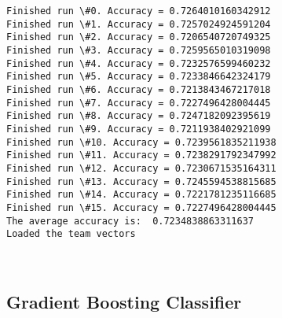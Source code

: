 \documentclass[11pt]{article}
\begin{document}
    \begin{Verbatim}[commandchars=\\\{\}]
Finished run \#0. Accuracy = 0.7264010160342912
Finished run \#1. Accuracy = 0.7257024924591204
Finished run \#2. Accuracy = 0.7206540720749325
Finished run \#3. Accuracy = 0.7259565010319098
Finished run \#4. Accuracy = 0.7232576599460232
Finished run \#5. Accuracy = 0.7233846642324179
Finished run \#6. Accuracy = 0.7213843467217018
Finished run \#7. Accuracy = 0.7227496428004445
Finished run \#8. Accuracy = 0.7247182092395619
Finished run \#9. Accuracy = 0.7211938402921099
Finished run \#10. Accuracy = 0.7239561835211938
Finished run \#11. Accuracy = 0.7238291792347992
Finished run \#12. Accuracy = 0.7230671535164311
Finished run \#13. Accuracy = 0.7245594538815685
Finished run \#14. Accuracy = 0.7221781235116685
Finished run \#15. Accuracy = 0.7227496428004445
The average accuracy is:  0.7234838863311637
Loaded the team vectors

    \end{Verbatim}

    \begin{center}
    \end{center}
    { \hspace*{\fill} \\}
    
    \hypertarget{gradient-boosting-classifier}{%
\subsection{Gradient Boosting
Classifier}\label{gradient-boosting-classifier}}
\end{document}
